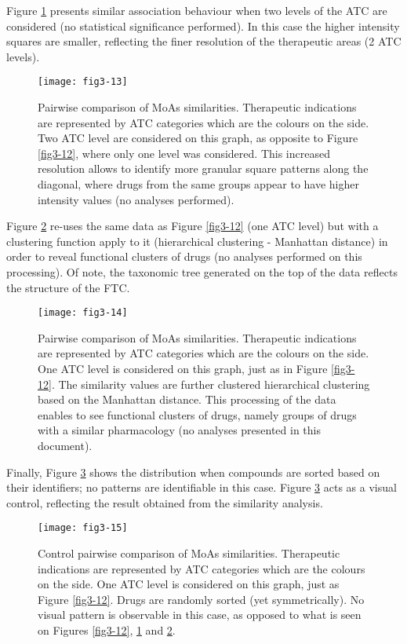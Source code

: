 Figure \ref{fig3-13} presents similar association behaviour when two levels of the ATC are considered (no statistical significance performed). In this case the higher intensity squares are smaller, reflecting the finer resolution of the therapeutic areas (2 ATC levels).

\begin{figure}[H]
    \centering
    \texttt{[image: fig3-13]}
    \caption{Pairwise comparison of MoAs similarities. Therapeutic indications are represented by ATC categories which are the colours on the side. Two ATC level are considered on this graph, as opposite to Figure \ref{fig3-12}, where only one level was considered. This increased resolution allows to identify more granular square patterns along the diagonal, where drugs from the same groups appear to have higher intensity values (no analyses performed).}
    \label{fig3-13}
\end{figure}

Figure \ref{fig3-14} re-uses the same data as Figure \ref{fig3-12} (one ATC level) but with a clustering function apply to it (hierarchical clustering - Manhattan distance) in order to reveal functional clusters of drugs (no analyses performed on this processing). Of note, the taxonomic tree generated on the top of the data reflects the structure of the FTC.

\begin{figure}[H]
    \centering
    \texttt{[image: fig3-14]}
    \caption{Pairwise comparison of MoAs similarities. Therapeutic indications are represented by ATC categories which are the colours on the side. One ATC level is considered on this graph, just as in Figure \ref{fig3-12}. The similarity values are further clustered hierarchical clustering based on the Manhattan distance. This processing of the data enables to see functional clusters of drugs, namely groups of drugs with a similar pharmacology (no analyses presented in this document).}
    \label{fig3-14}
\end{figure}

Finally, Figure \ref{fig3-15} shows the distribution when compounds are sorted based on their identifiers; no patterns are identifiable in this case. Figure \ref{fig3-15} acts as a visual control, reflecting the result obtained from the similarity analysis.

\begin{figure}[H]
    \centering
    \texttt{[image: fig3-15]}
    \caption{Control pairwise comparison of MoAs similarities. Therapeutic indications are represented by ATC categories which are the colours on the side. One ATC level is considered on this graph, just as Figure \ref{fig3-12}. Drugs are randomly sorted (yet symmetrically). No visual pattern is observable in this case, as opposed to what is seen on Figures \ref{fig3-12}, \ref{fig3-13} and \ref{fig3-14}.}
    \label{fig3-15}
\end{figure}

